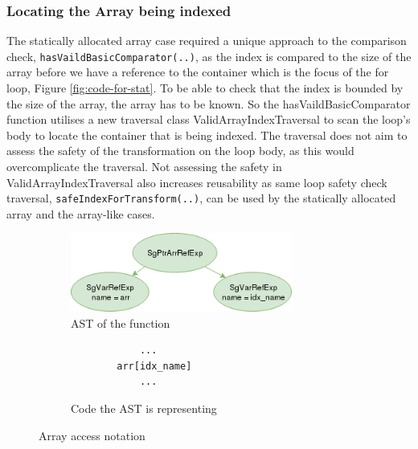 \documentclass[bsc,frontabs,singlespacing,twoside,parskip,deptreport]{infthesis}
\begin{document}
\subsubsection{Locating the Array being indexed}

The statically allocated array case required a unique approach to the comparison check, \texttt{hasVaildBasicComparator(..)}, as the index is compared to the size of the array before we have a reference to the container which is the focus of the for loop, Figure \ref{fig:code-for-stat}. To be able to check that the index is bounded by the size of the array, the array has to be known. So the hasVaildBasicComparator function utilises a new traversal class ValidArrayIndexTraversal to scan the loop's body to locate the container that is being indexed. The traversal does not aim to assess the safety of the transformation on the loop body, as this would overcomplicate the traversal. Not assessing the safety in ValidArrayIndexTraversal also increases reusability as same loop safety check traversal, \texttt{safeIndexForTransform(..)}, can be used by the statically allocated array and the array-like cases. 

\begin{figure}[H]
    \begin{subfigure}[b]{0.6\textwidth}
        \centering
        \includegraphics[width=0.8\textwidth]{images/ArrPtrAcc.png}
        \caption{AST of the function}
        \label{fig:arr-acc-AST}
    \end{subfigure}
    \hfill
    \begin{subfigure}[b]{0.4\textwidth}
        \centering
        \begin{verbatim}
            ...
        arr[idx_name]
            ...
        \end{verbatim}
        \caption{Code the AST is representing}
        \label{fig:arr-acc-code}
    \end{subfigure}
    \vspace{-0.5cm}
    \caption{Array access notation}
    \label{fig:arr-access}
\end{figure}
\end{document}
